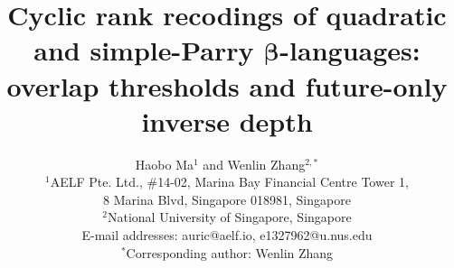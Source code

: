 \documentclass[10pt,a4paper]{article}
\title{Cyclic rank recodings of quadratic and simple-Parry
$\boldsymbol{\beta}$-languages: overlap thresholds and future-only inverse depth}
\author{Haobo Ma$^{1}$ and Wenlin Zhang$^{2,*}$\\[4pt]
{\small $^1$AELF Pte. Ltd., \#14-02, Marina Bay Financial Centre Tower 1,}\\
{\small 8 Marina Blvd, Singapore 018981, Singapore}\\
{\small $^2$National University of Singapore, Singapore}\\[2pt]
{\small E-mail addresses: auric@aelf.io, e1327962@u.nus.edu}\\
{\small $^*$Corresponding author: Wenlin Zhang}}
\date{}
\theoremstyle{definition}
\theoremstyle{plain}
\theoremstyle{remark}
\numberwithin{equation}{section}
\begin{document}
\linenumbers
\maketitle












\appendix





\end{document}
